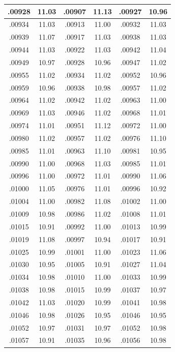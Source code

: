 \documentclass[11pt]{report}
\begin{document}
\begin{appendices}
\begin{longtable}{|c|c||c|c||c|c|}
.00928 & 11.03 & .00907 & 11.13 & .00927 & 10.96\\\hline
.00934 & 11.03 & .00913 & 11.00 & .00932 & 11.03\\\hline
.00939 & 11.07 & .00917 & 11.03 & .00938 & 11.03\\\hline
.00944 & 11.03 & .00922 & 11.03 & .00942 & 11.04\\\hline
.00949 & 10.97 & .00928 & 10.96 & .00947 & 11.02\\\hline
.00955 & 11.02 & .00934 & 11.02 & .00952 & 10.96\\\hline
.00959 & 10.96 & .00938 & 10.98 & .00957 & 11.02\\\hline
.00964 & 11.02 & .00942 & 11.02 & .00963 & 11.00\\\hline
.00969 & 11.03 & .00946 & 11.02 & .00968 & 11.01\\\hline
.00974 & 11.01 & .00951 & 11.12 & .00972 & 11.00\\\hline
.00980 & 11.02 & .00957 & 11.02 & .00976 & 11.10\\\hline
.00985 & 11.01 & .00963 & 11.10 & .00981 & 10.95\\\hline
.00990 & 11.00 & .00968 & 11.03 & .00985 & 11.01\\\hline
.00996 & 11.00 & .00972 & 11.01 & .00990 & 11.06\\\hline
.01000 & 11.05 & .00976 & 11.01 & .00996 & 10.92\\\hline
.01004 & 11.00 & .00982 & 11.08 & .01002 & 11.00\\\hline
.01009 & 10.98 & .00986 & 11.02 & .01008 & 11.01\\\hline
.01015 & 10.91 & .00992 & 11.00 & .01013 & 10.99\\\hline
.01019 & 11.08 & .00997 & 10.94 & .01017 & 10.91\\\hline
.01025 & 10.99 & .01001 & 11.00 & .01023 & 11.06\\\hline
.01030 & 10.95 & .01005 & 10.91 & .01027 & 11.04\\\hline
.01034 & 10.98 & .01010 & 11.00 & .01033 & 10.99\\\hline
.01038 & 10.98 & .01015 & 10.99 & .01037 & 10.97\\\hline
.01042 & 11.03 & .01020 & 10.99 & .01041 & 10.98\\\hline
.01046 & 10.98 & .01026 & 10.95 & .01046 & 10.95\\\hline
.01052 & 10.97 & .01031 & 10.97 & .01052 & 10.98\\\hline
.01057 & 10.91 & .01035 & 10.96 & .01056 & 10.98\\\hline

\end{longtable}
\end{appendices}
\end{document}
